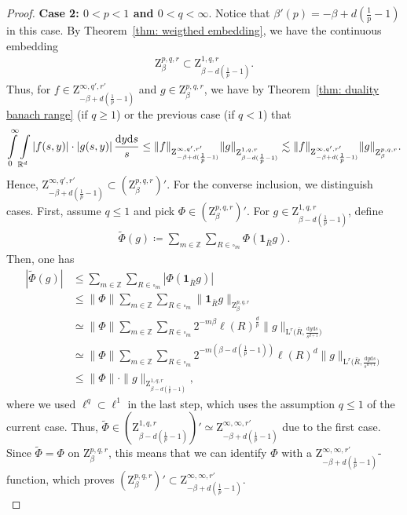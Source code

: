 \documentclass[10pt,a4paper]{amsart}
\newcommand{\IR}{\mathbb{R}}
\newcommand{\IZ}{\mathbb{Z}}
\renewcommand{\L}{\mathrm{L}}
\newcommand{\Z}{\mathrm{Z}}
\renewcommand{\d}{\mathrm{d}}
\begin{document}
\begin{proof}
    \noindent \textbf{Case 2: $0<p<1$ and $0<q<\infty$}.
    Notice that $\beta'(p)=-\beta +d(\frac{1}{p}-1)$ in this case. By Theorem~\ref{thm: weigthed embedding}, we have the continuous embedding
    \begin{align*}
         \Z^{p,q,r}_\beta \subset \Z^{1,q,r}_{\beta-d(\frac{1}{p}-1)}.
    \end{align*}
    Thus, for $f\in \Z^{\infty,q',r'}_{-\beta+d(\frac{1}{p}-1)}$ and $g\in \Z^{p,q,r}_\beta$, we have by Theorem~\ref{thm: duality banach range} (if $q\geq 1$) or the previous case (if $q<1$) that
    \begin{align*}
        \int\limits_{0}^\infty\int\limits_{\IR^d} |f(s,y)|\cdot |g(s,y)|\,\frac{\d y \d s}{s} \leq \|f\|_{ \Z^{\infty,q',r'}_{-\beta+d(\frac{1}{p}-1)}}  \|g\|_{ \Z^{\vphantom{p',q',r'}1,q,r}_{\beta-d(\frac{1}{p}-1)}}\lesssim \|f\|_{ \Z^{\infty,q',r'}_{-\beta+d(\frac{1}{p}-1)}}  \|g\|_{ \Z^{\vphantom{p',q',r'}p,q,r}_\beta }.
    \end{align*}
    Hence, $ \Z^{\infty,q',r'}_{-\beta+d(\frac{1}{p}-1)}\subset ( \Z^{p,q,r}_\beta )'$. For the converse inclusion, we distinguish cases. First, assume $q\leq 1$ and pick $\Phi \in ( \Z^{p,q,r}_\beta )'$. For $g\in  \Z^{1,q,r}_{\beta-d(\frac{1}{p}-1)}$, define
    \begin{align*}
        \tilde \Phi (g) \coloneqq \sum\limits_{m\in\IZ} \sum\limits_{R\in\square_m} \Phi(\mathbf{1}_{\bar R}g).
    \end{align*}
    Then, one has
    \begin{align*}
        |\tilde \Phi (g)| &\leq \sum\limits_{m\in\IZ} \sum\limits_{R\in\square_m} |\Phi(\mathbf{1}_{\bar R}g)|\\
        &\leq \|\Phi\|\sum\limits_{m\in\IZ} \sum\limits_{R\in\square_m} \|\mathbf{1}_{\bar R} g\|_{\Z^{p,q,r}_\beta}\\
        &\simeq  \|\Phi\|\sum\limits_{m\in\IZ} \sum\limits_{R\in\square_m} 2^{-m\beta}\ell(R)^\frac{d}{p}\| g\|_{\L^r\big(\bar R, \frac{\d y \d s}{s^{d+1}}\big)}\\
        &\simeq  \|\Phi\|\sum\limits_{m\in\IZ} \sum\limits_{R\in\square_m} 2^{-m(\beta-d(\frac{1}{p}-1))}\ell(R)^d\| g\|_{\L^r\big(\bar R, \frac{\d y \d s}{s^{d+1}}\big)}\\
        &\leq \|\Phi\|\cdot \|g\|_{\Z^{1,q,r}_{\beta-d(\frac{1}{p}-1)}},
    \end{align*}
    where we used $\ell^q \subset \ell^1$ in the last step, which uses the assumption $q \leq 1$ of the current case.
    Thus, $\tilde \Phi \in (\Z^{1,q,r}_{\beta-d(\frac{1}{p}-1)})' \simeq \Z^{\infty,\infty,r'}_{-\beta+d(\frac{1}{p}-1)}$ due to the first case. Since $\tilde \Phi = \Phi$ on $\Z^{p,q,r}_\beta$, this means that we can identify $\Phi$ with a $ \Z^{\infty,\infty,r'}_{-\beta+d(\frac{1}{p}-1)}$-function, which proves $(\Z^{p,q,r}_\beta)'\subset  \Z^{\infty,\infty,r'}_{-\beta+d(\frac{1}{p}-1)}$.\\


\end{proof}
\end{document}
